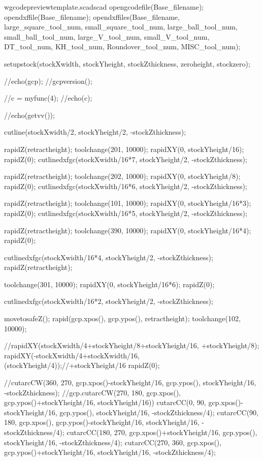 \documentclass{ltxdoc}
\begin{document}
\begin{writecode}{w}{gcodepreviewtemplate.scad}{scad}
opengcodefile(Base_filename);
opendxffile(Base_filename);
opendxffiles(Base_filename, 
                 large_square_tool_num, 
                 small_square_tool_num, 
                 large_ball_tool_num, 
                 small_ball_tool_num, 
                 large_V_tool_num, 
                 small_V_tool_num, 
                 DT_tool_num, 
                 KH_tool_num, 
                 Roundover_tool_num, 
                 MISC_tool_num);

setupstock(stockXwidth, stockYheight, stockZthickness, zeroheight, stockzero);

//echo(gcp);
//gcpversion();

//c = myfunc(4);
//echo(c);

//echo(getvv());

cutline(stockXwidth/2, stockYheight/2, -stockZthickness);

rapidZ(retractheight);
toolchange(201, 10000);
rapidXY(0, stockYheight/16);
rapidZ(0);
cutlinedxfgc(stockXwidth/16*7, stockYheight/2, -stockZthickness);


rapidZ(retractheight);
toolchange(202, 10000);
rapidXY(0, stockYheight/8);
rapidZ(0);
cutlinedxfgc(stockXwidth/16*6, stockYheight/2, -stockZthickness);

rapidZ(retractheight);
toolchange(101, 10000);
rapidXY(0, stockYheight/16*3);
rapidZ(0);
cutlinedxfgc(stockXwidth/16*5, stockYheight/2, -stockZthickness);

rapidZ(retractheight);
toolchange(390, 10000);
rapidXY(0, stockYheight/16*4);
rapidZ(0);

cutlinedxfgc(stockXwidth/16*4, stockYheight/2, -stockZthickness);
rapidZ(retractheight);

toolchange(301, 10000);
rapidXY(0, stockYheight/16*6);
rapidZ(0);

cutlinedxfgc(stockXwidth/16*2, stockYheight/2, -stockZthickness);


movetosafeZ();
rapid(gcp.xpos(), gcp.ypos(), retractheight);
toolchange(102, 10000);

//rapidXY(stockXwidth/4+stockYheight/8+stockYheight/16, +stockYheight/8);
rapidXY(-stockXwidth/4+stockXwidth/16, (stockYheight/4));//+stockYheight/16
rapidZ(0);

//cutarcCW(360, 270, gcp.xpos()-stockYheight/16, gcp.ypos(), stockYheight/16, -stockZthickness);
//gcp.cutarcCW(270, 180, gcp.xpos(), gcp.ypos()+stockYheight/16, stockYheight/16))
cutarcCC(0, 90, gcp.xpos()-stockYheight/16, gcp.ypos(), stockYheight/16, -stockZthickness/4);
cutarcCC(90, 180, gcp.xpos(), gcp.ypos()-stockYheight/16, stockYheight/16, -stockZthickness/4);
cutarcCC(180, 270, gcp.xpos()+stockYheight/16, gcp.ypos(), stockYheight/16, -stockZthickness/4);
cutarcCC(270, 360, gcp.xpos(), gcp.ypos()+stockYheight/16, stockYheight/16, -stockZthickness/4);


\end{writecode}
\end{document}
